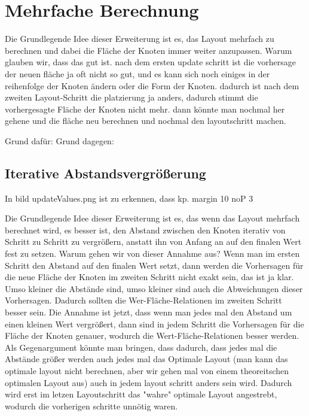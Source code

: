 \section{Mehrfache Berechnung} \label{sec:MehrfacheBerechnung}
Die Grundlegende Idee dieser Erweiterung ist es, das Layout mehrfach zu berechnen und dabei die Fläche der Knoten immer weiter anzupassen. 
Warum glauben wir, dass das gut ist. nach dem ersten update schritt ist die vorhersage der neuen fläche ja oft nicht so gut, und es kann sich noch einiges in der reihenfolge der Knoten ändern oder die Form der Knoten. dadurch ist nach dem zweiten Layout-Schritt die platzierung ja anders, dadurch stimmt die vorhergesagte Fläche der Knoten nicht mehr. dann könnte man nochmal her gehene und die fläche neu berechnen und nochmal den layoutschritt machen. 

Grund dafür:
Grund dagegen: 

\subsection{Iterative Abstandsvergrößerung} \label{sec:IterativeAbstandsvergrößerung}
In bild updateValues.png ist zu erkennen, dass kp. margin 10 noP 3

Die Grundlegende Idee dieser Erweiterung ist es, das wenn das Layout mehrfach berechnet wird, es besser ist, den Abstand zwischen den Knoten iterativ von Schritt zu Schritt zu vergrößern, anstatt ihn von Anfang an auf den finalen Wert fest zu setzen. 
Warum gehen wir von dieser Annahme aus? 
Wenn man im ersten Schritt den Abstand auf den finalen Wert setzt, dann werden die Vorhersagen für die neue Fläche der Knoten im zweiten Schritt nicht exakt sein, das ist ja klar. Umso kleiner die Abstände sind, umso kleiner sind auch die Abweichungen dieser Vorhersagen. Dadurch sollten die Wer-Fläche-Relationen im zweiten Schritt besser sein. 
Die Annahme ist jetzt, dass wenn man jedes mal den Abstand um einen kleinen Wert vergrößert, dann sind in jedem Schritt die Vorhersagen für die Fläche der Knoten genauer, wodurch die Wert-Fläche-Relationen besser werden. Als Gegenargument könnte man bringen, dass dadurch, dass jedes mal die Abstände größer werden auch jedes mal das Optimale Layout (man kann das optimale layout nicht berechnen, aber wir gehen mal von einem theoreitschen optimalen Layout aus) auch in jedem layout schritt anders sein wird. Dadurch wird erst im letzen Layoutschritt das "wahre" optimale Layout angestrebt, wodurch die vorherigen schritte unnötig waren.

